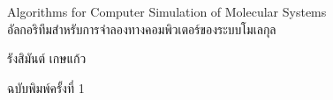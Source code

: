 

{
\thispagestyle{empty}

\begin{center}
    \vspace*{1.0in}
    
    \begin{spacing}{3}
    {\Huge Algorithms for Computer Simulation of Molecular Systems}\\
    {\LARGE อัลกอริทึมสำหรับการจำลองทางคอมพิวเตอร์ของระบบโมเลกุล}
    \end{spacing}
    
    \vspace{1.0in}
    
    {\LARGE  รังสิมันต์ เกษแก้ว}
    
    \vspace{1.5in}
    
    {\LARGE ฉบับพิมพ์ครั้งที่ 1}
    \vspace{0.5in}
    
    \vfill
\end{center}
}
